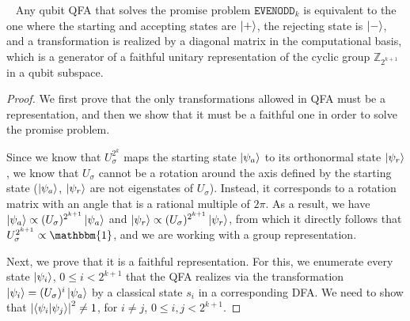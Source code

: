 \documentclass[../main.tex]{subfiles}
\begin{document}
\begin{theorem}~\label{thm:UnaryQFAself-testing} Any qubit QFA that solves the promise problem $\mathtt{EVENODD}_k$  is equivalent to the one where the starting and accepting states are $\ket{+}$, the rejecting state is $\ket{-}$, and a transformation is realized by a diagonal matrix in the computational basis, which is a generator of a faithful unitary representation of the cyclic group $\mathbb{Z}_{2^{k+1}}$ in a qubit subspace. 
\end{theorem}
\begin{proof}
We first prove that the only transformations allowed in QFA must be a representation, and then we show that it must be a faithful one in order to solve the promise problem. %

Since we know that $U_\sigma^{2^{k}}$ maps the starting state $\ket{\psi_a}$  to its orthonormal state $\ket{\psi_r}$, we know that $U_\sigma$ cannot be a rotation around the axis defined by the starting state ($\ket{\psi_a}$, $\ket{\psi_r}$ are not eigenstates of $U_\sigma$). Instead, it corresponds to a rotation matrix with an angle that is a rational multiple of $2\pi$. As a result, we have $\ket{\psi_a}\propto(U_\sigma)^{2^{k+1}} \ket{\psi_a}$ and $\ket{\psi_r}\propto(U_\sigma)^{2^{k+1}} \ket{\psi_r}$, from which it directly follows that $U_\sigma^{2^{k+1}} \propto \mathbbm{1}$, and we are working with a group representation. 

Next, we prove that it is a faithful representation. For this, we enumerate every state  $\ket{\psi_i}$, $0 \leq i< 2^{k+1}$  that the QFA realizes via the transformation $\ket{\psi_i}=(U_\sigma)^i \ket{\psi_a}$ by a classical state $s_i$ in a corresponding DFA. 
We need to show that $\left|\braket{\psi_i}{\psi_j}\right|^2\neq 1$, for $i\neq j$, $0 \leq i,j< 2^{k+1}$.


\end{proof}
\end{document}
